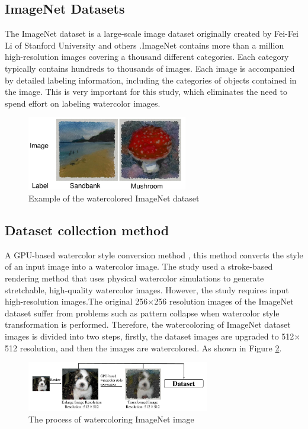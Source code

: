 \documentclass{acsman}
\begin{document}
\subsection{ImageNet Datasets}
The ImageNet dataset is a large-scale image dataset originally created by Fei-Fei Li of Stanford University and others \cite{deng2009imagenet}.ImageNet contains more than a million high-resolution images covering a thousand different categories. Each category typically contains hundreds to thousands of images. Each image is accompanied by detailed labeling information, including the categories of objects contained in the image. This is very important for this study, which eliminates the need to spend effort on labeling watercolor images.

\begin{figure}[h]
    \centering
    \includegraphics[width=7cm]{image/dataset.pdf}
    \caption{Example of the watercolored ImageNet dataset}
    \label{fig:dataset}
\end{figure}

\subsection{Dataset collection method}
A GPU-based watercolor style conversion method \cite{huang2021gpu}, this method converts the style of an input image into a watercolor image. The study used a stroke-based rendering method that uses physical watercolor simulations to generate stretchable, high-quality watercolor images. However, the study requires input high-resolution images.The original 256$\times$256 resolution images of the ImageNet dataset suffer from problems such as pattern collapse when watercolor style transformation is performed. Therefore, the watercoloring of ImageNet dataset images is divided into two steps, firstly, the dataset images are upgraded to 512$\times$512 resolution, and then the images are watercolored. As shown in Figure \ref{fig:gpu}.

\begin{figure}[h]
    \centering
    \includegraphics[width=8cm]{image/gpu.pdf}
    \caption{The process of watercoloring ImageNet image}
    \label{fig:gpu}
\end{figure}
\end{document}
